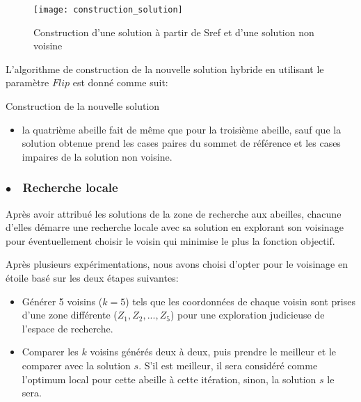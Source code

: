 \begin{spacing}{1.6}
\begin{itemize}
	\vspace{1em}

	\begin{figure}[H]
		\centering
		\texttt{[image: construction\_solution]}
		\caption{Construction d'une solution à partir de Sref et d'une solution non voisine}
	\end{figure}

	\parbox[][0.5em]{\textwidth}{}

	L'algorithme de construction de la nouvelle solution hybride en utilisant le paramètre $Flip$ est donné comme suit:\\
	
\end{itemize}
	
	\begin{algorithm}[H]
		\caption{Construction de la nouvelle solution}
	\end{algorithm}
\vspace{3em}

\begin{itemize}
	\item la quatrième abeille fait de même que pour la troisième abeille, sauf que la solution obtenue prend les cases paires du sommet de référence et les cases impaires de la solution non voisine.
\end{itemize}
\end{spacing}

\vspace{-0.5em}

\subsubsection{$\bullet\quad$Recherche locale}

\vspace{-0.5em}

Après avoir attribué les solutions de la zone de recherche aux abeilles, chacune d'elles démarre une recherche locale avec sa solution en explorant son voisinage pour éventuellement choisir le voisin qui minimise le plus la fonction objectif.

Après plusieurs expérimentations, nous avons choisi d'opter pour le voisinage en étoile basé sur les deux étapes suivantes:
\begin{itemize}
	\item Générer 5 voisins ($k=5$) tels que les coordonnées de chaque voisin sont prises d'une zone différente ($Z_1,Z_2,...,Z_5$) pour une exploration judicieuse de l'espace de recherche.
	\item Comparer les $k$ voisins générés deux à deux, puis prendre le meilleur et le comparer avec la solution $s$. S'il est meilleur, il sera considéré comme l'optimum local pour cette abeille à cette itération, sinon, la solution $s$ le sera.
\end{itemize}

